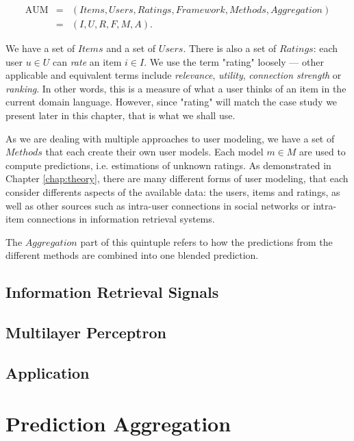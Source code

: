 \begin{eqnarray*}
  \mathrm{AUM} &=& (Items, Users, Ratings, Framework, Methods, Aggregation)\\
               &=& (I,U,R,F,M,A).
\end{eqnarray*}

We have a set of $Items$ and a set of $Users$.
There is also a set of $Ratings$: each user $u \in U$ can \emph{rate} an item $i \in I$.
We use the term "rating" loosely --- other applicable and equivalent terms include \emph{relevance}, \emph{utility},
\emph{connection strength} or \emph{ranking}. In other words, this is a measure of what a user thinks of an item
in the current domain language. However, since "rating" will match the case study we present later in this chapter,
that is what we shall use.

As we are dealing with multiple approaches to user modeling, we have a set of $Methods$ that each create their own
user models. Each model $m \in M$ are used to compute predictions, i.e. estimations of unknown ratings.
As demonstrated in Chapter \ref{chap:theory}, there are many different forms of user modeling,
that each consider differents aspects of the available data: the users, items and ratings, as well as 
other sources such as intra-user connections in social networks or intra-item connections in information retrieval systems.

The $Aggregation$ part of this quintuple refers to how the predictions from the different methods are combined
into one blended prediction. 

\subsection{Information Retrieval Signals}

\subsection{Multilayer Perceptron}

\subsection{Application}



\section{Prediction Aggregation}

